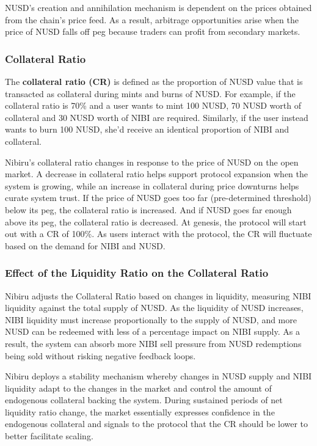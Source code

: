 \documentclass[11pt]{article}
\begin{document}
NUSD’s creation and annihilation mechanism is dependent on the prices obtained from the chain’s price feed. As a result, arbitrage opportunities arise when the price of NUSD falls off peg because traders can profit from secondary markets.

\subsubsection{Collateral Ratio}

The \textbf{collateral ratio (CR)} is defined as the proportion of NUSD value that is transacted as collateral during mints and burns of NUSD. For example, if the collateral ratio is 70\% and a user wants to mint 100 NUSD,  70 NUSD worth of collateral and 30 NUSD worth of NIBI are required. Similarly, if the user instead wants to burn 100 NUSD, she’d receive an identical proportion of NIBI and collateral.

Nibiru’s collateral ratio changes in response to the price of NUSD on the open market. A decrease in collateral ratio helps support protocol expansion when the system is growing, while an increase in collateral during price downturns helps curate system trust. If the price of NUSD goes too far (pre-determined threshold) below its peg, the collateral ratio is increased. And if NUSD goes far enough above its peg, the collateral ratio is decreased. At genesis, the protocol will start out with a CR of 100\%. As users interact with the protocol, the CR will fluctuate based on the demand for NIBI and NUSD.

\subsubsection{Effect of the Liquidity Ratio on the Collateral Ratio}

Nibiru adjusts the Collateral Ratio based on changes in liquidity, measuring NIBI liquidity against the total supply of NUSD. As the liquidity of NUSD increases, NIBI liquidity must increase proportionally to the supply of NUSD, and more NUSD can be redeemed with less of a percentage impact on NIBI supply. As a result, the system can absorb more NIBI sell pressure from NUSD redemptions being sold without risking negative feedback loops.

Nibiru deploys a stability mechanism whereby changes in NUSD supply and NIBI liquidity adapt to the changes in the market and control the amount of endogenous collateral backing the system. During sustained periods of net liquidity ratio change, the market essentially expresses confidence in the endogenous collateral and signals to the protocol that the CR should be lower to better facilitate scaling.
\end{document}
